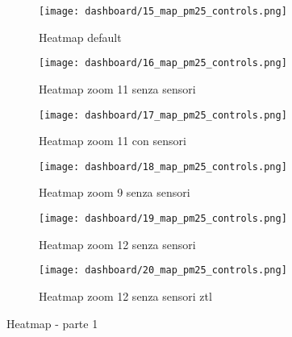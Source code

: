 \begin{figure}[H]
  \centering

  \begin{subfigure}{0.48\textwidth}
    \centering
    \texttt{[image: dashboard/15\_map\_pm25\_controls.png]}
    \caption{Heatmap default}
    \label{fig:app-map-pm25-controls-15}
  \end{subfigure}
  \hfill
  \begin{subfigure}{0.48\textwidth}
    \centering
    \texttt{[image: dashboard/16\_map\_pm25\_controls.png]}
    \caption{Heatmap zoom 11 senza sensori}
    \label{fig:app-map-pm25-controls-16}
  \end{subfigure}

  \vspace{1em}

  \begin{subfigure}{0.48\textwidth}
    \centering
    \texttt{[image: dashboard/17\_map\_pm25\_controls.png]}
    \caption{Heatmap zoom 11 con sensori}
    \label{fig:app-map-pm25-controls-17}
  \end{subfigure}
  \hfill
  \begin{subfigure}{0.48\textwidth}
    \centering
    \texttt{[image: dashboard/18\_map\_pm25\_controls.png]}
    \caption{Heatmap zoom 9 senza sensori}
    \label{fig:app-map-pm25-controls-18}
  \end{subfigure}

  \vspace{1em}

  \begin{subfigure}{0.48\textwidth}
    \centering
    \texttt{[image: dashboard/19\_map\_pm25\_controls.png]}
    \caption{Heatmap zoom 12 senza sensori}
    \label{fig:app-map-pm25-controls-19}
  \end{subfigure}
  \hfill
  \begin{subfigure}{0.48\textwidth}
    \centering
    \texttt{[image: dashboard/20\_map\_pm25\_controls.png]}
    \caption{Heatmap zoom 12 senza sensori \acrshort{ztl}}
    \label{fig:app-map-pm25-controls-20}
  \end{subfigure}

  \caption{Heatmap - parte 1}
  \label{fig:app-map-heatmap-1}
\end{figure}

